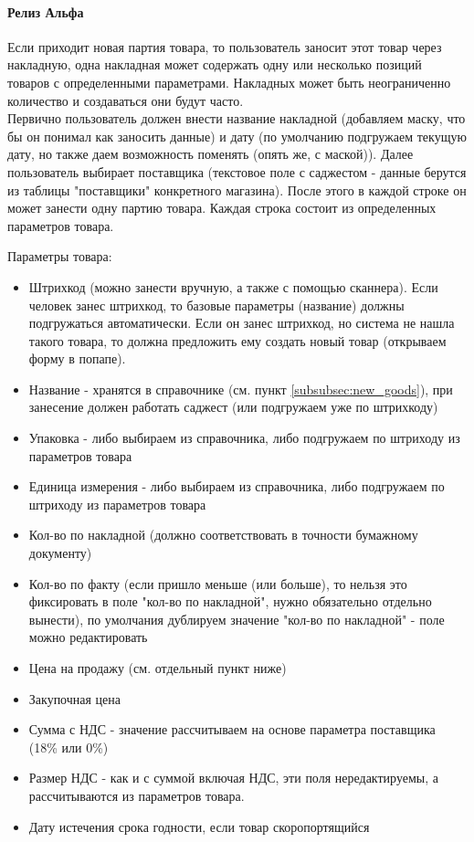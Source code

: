 \documentclass[DIV=calc, paper=a4, fontsize=11pt]{scrartcl} %
\begin{document}
\paragraph{Релиз Альфа}
Если приходит новая партия товара, то пользователь заносит этот товар через накладную, одна накладная может содержать одну или несколько позиций товаров с определенными параметрами. Накладных может быть неограниченно количество и создаваться они будут часто.
\\[0.5cm]
Первично пользователь должен внести название накладной (добавляем маску, что бы он понимал как заносить данные) и дату (по умолчанию подгружаем текущую дату, но также даем возможность поменять (опять же, с маской)). Далее пользователь выбирает поставщика (текстовое поле с саджестом - данные берутся из таблицы "поставщики" конкретного магазина). После этого в каждой строке он может занести одну партию товара. Каждая строка состоит из определенных параметров товара.

Параметры товара:

\begin{itemize}
	\item Штрихкод (можно занести вручную, а также с помощью сканнера). Если человек занес штрихкод, то базовые параметры (название) должны подгружаться автоматически. Если он занес штрихкод, но система не нашла такого товара, то должна предложить ему создать новый товар (открываем форму в попапе).
	\item Название - хранятся в справочнике (см. пункт \ref{subsubsec:new_goods}), при занесение должен работать саджест (или подгружаем уже по штрихкоду)
	\item Упаковка - либо выбираем из справочника, либо подгружаем по штриходу из параметров товара
	\item Единица измерения - либо выбираем из справочника, либо подгружаем по штриходу из параметров товара
	\item Кол-во по накладной (должно соответствовать в точности бумажному документу)
	\item Кол-во по факту (если пришло меньше (или больше), то нельзя это фиксировать в поле "кол-во по накладной", нужно обязательно отдельно вынести), по умолчания дублируем значение "кол-во по накладной" - поле можно редактировать
	\item Цена на продажу (см. отдельный пункт ниже)
	\item Закупочная цена
	\item Сумма с НДС - значение рассчитываем на основе параметра поставщика (18\% или 0\%)
	\item Размер НДС - как и с суммой включая НДС, эти поля нередактируемы, а рассчитываются из параметров товара.
	\item Дату истечения срока годности, если товар скоропортящийся
\end{itemize}
\end{document}
